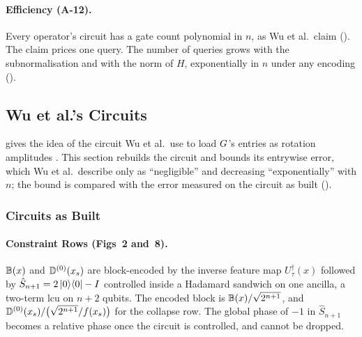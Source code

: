 \paragraph{Efficiency (A-12).} Every operator's circuit has a gate count polynomial in $n$, as Wu et al.\ claim (). The claim prices one query. The number of queries grows with the subnormalisation and with the norm of $H$, exponentially in $n$ under any encoding ().

\subsection{Wu et al.'s Circuits}
\label{app:pihm-circuit}

 gives the idea of the circuit Wu et al.\ use to load $G$'s entries as rotation amplitudes \cite{wu2025pihm}. This section rebuilds the circuit and bounds its entrywise error, which Wu et al.\ describe only as ``negligible'' and decreasing ``exponentially'' with $n$; the bound is compared with the error measured on the circuit as built ().

\subsubsection{Circuits as Built}
\label{app:published-build}

\paragraph{Constraint Rows (Figs~2 and~8).} $\mathbb{B}(x)$ and $\mathbb{D}^{(0)}(x_s)$ are block-encoded by the inverse feature map $U_\tau^\dagger(x)$ followed by $\hat S_{n+1} = 2\ket{0}\!\bra{0}-I$ controlled inside a Hadamard sandwich on one ancilla, a two-term \gls{lcu} on $n+2$ qubits. The encoded block is $\mathbb{B}(x)/\sqrt{2^{n+1}}$, and $\mathbb{D}^{(0)}(x_s)/\bigl(\sqrt{2^{n+1}}/f(x_s)\bigr)$ for the collapse row. The global phase of $-1$ in $\hat S_{n+1}$ becomes a relative phase once the circuit is controlled, and cannot be dropped.

